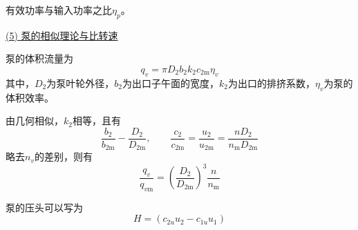 \quad 有效功率与输入功率之比$\eta_p$。

\vspace*{1em}


\underline{(5) \hspace*{0.3em} 泵的相似理论与比转速}


\clearpage

\noindent \textbf{\blue[【流量关系】]}

泵的体积流量为
\begin{equation}
	q_v = \pi D_2 b_2 k_2 c_{2\text{m}}\eta_v
\end{equation}
其中，$D_2$为泵叶轮外径，$b_2$为出口子午面的宽度，$k_2$为出口的排挤系数，$\eta_v$为泵的体积效率。

由几何相似，$k_2$相等，且有
\begin{equation}
	\dfrac{b_2}{b_{2\text{m}}} - \dfrac{D_2}{D_{2\text{m}}}, \qquad \dfrac{c_2}{c_{2 \text{m}}} = \dfrac{u_2}{u_{2 \text{m}}} = \dfrac{nD_2}{n_{\text{m}} D_{2 \text{m}}}
\end{equation}
略去$n_v$的差别，则有
\begin{equation}
	\dfrac{q_v}{q_{v\text{m}}} = \left(\dfrac{D_2}{D_{2 \text{m}}}\right)^3 \dfrac{n}{n_{\text{m}}}
\end{equation}
\vspace*{0.5em}

\noindent \textbf{\blue[【压头关系】]}
泵的压头可以写为
\begin{equation}
	H = (c_{2u}u_2 - c_{1u}u_1)
\end{equation}




